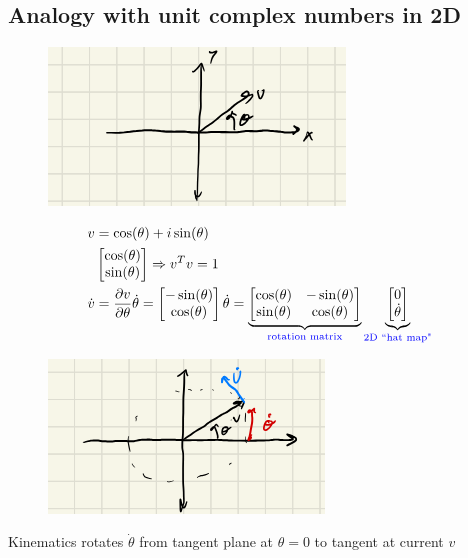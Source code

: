 \documentclass[11pt]{article}
\begin{document}
\subsection{Analogy with unit complex numbers in 2D}
\begin{figure}[H]
    \centering
    \includegraphics[width=0.5\linewidth]{lecture_15_3.png}
\end{figure}
\begin{align*}
    v &= \cos(\theta) + i \sin(\theta)
    \\
    & \begin{bmatrix}
        \cos(\theta) \\
        \sin(\theta)
    \end{bmatrix}
    \Rightarrow v^Tv = 1
    \\
    \dot{v} &= \frac{\partial v}{\partial \theta}\dot{\theta} = 
    \begin{bmatrix}
        -\sin(\theta) \\
        \cos(\theta)
    \end{bmatrix}
    \dot{\theta}
    =
    \underbrace{
    \begin{bmatrix}
        \cos(\theta) & -\sin(\theta) \\
        \sin(\theta) & \cos(\theta)
    \end{bmatrix}}_{\textcolor{blue}{\text{rotation matrix}}}
    \underbrace{
    \begin{bmatrix}
        0 \\
        \dot{\theta}
    \end{bmatrix}
    }_{\textcolor{blue}{\text{2D ``hat map"}}}
\end{align*}
\begin{figure}[H]
    \centering
    \includegraphics[width=0.5\linewidth]{lecture_15_4.png}
\end{figure}
Kinematics rotates $\dot{\theta}$ from tangent plane at $\theta=0$ to tangent at current $v$
\end{document}
